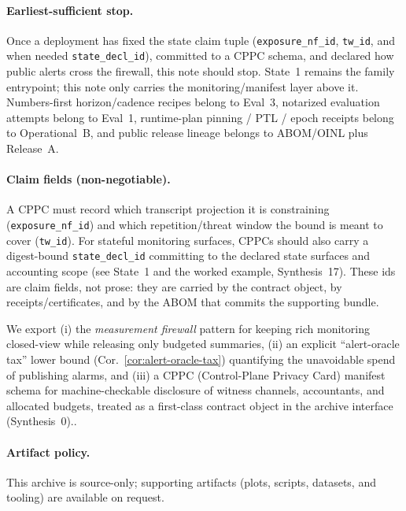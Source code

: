 \documentclass[11pt]{article}
\begin{document}
\paragraph{Earliest-sufficient stop.}
Once a deployment has fixed the state claim tuple (\texttt{exposure\_nf\_id}, \texttt{tw\_id}, and when needed \texttt{state\_decl\_id}), committed to a CPPC schema, and declared how public alerts cross the firewall, this note should stop.
State~1 remains the family entrypoint; this note only carries the monitoring/manifest layer above it.
Numbers-first horizon/cadence recipes belong to Eval~3, notarized evaluation attempts belong to Eval~1, runtime-plan pinning / PTL / epoch receipts belong to Operational~B, and public release lineage belongs to ABOM/OINL plus Release~A.\cite{series:state1,series:eval3,series:evalnotary,series:opB,series:abomoinl,series:release}

\paragraph{Claim fields (non-negotiable).}
A CPPC must record which transcript projection it is constraining (\texttt{exposure\_nf\_id}) and which repetition/threat window the bound is meant to cover (\texttt{tw\_id}). For stateful monitoring surfaces, CPPCs should also carry a digest-bound \texttt{state\_decl\_id} committing to the declared state surfaces and accounting scope (see State~1 and the worked example, Synthesis~17).
These ids are claim fields, not prose: they are carried by the contract object, by receipts/certificates, and by the ABOM that commits the supporting bundle.


We export (i) the \emph{measurement firewall} pattern for keeping rich monitoring closed-view while releasing only budgeted summaries, (ii) an explicit ``alert-oracle tax'' lower bound (Cor.~\ref{cor:alert-oracle-tax}) quantifying the unavoidable spend of publishing alarms, and (iii) a CPPC (Control-Plane Privacy Card) manifest schema for machine-checkable disclosure of witness channels, accountants, and allocated budgets, treated as a first-class contract object in the archive interface (Synthesis~0).\cite{series:contractobjects}.

\paragraph{Artifact policy.}
This archive is source-only; supporting artifacts (plots, scripts, datasets, and tooling) are available on request.\cite{series:artifactpolicy}
\end{document}
